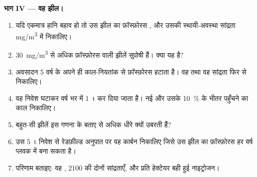 \begin{problem}
\medskip
\noindent\textbf{भाग IV --- वह झील।}
\begin{enumerate}[resume]
  \item यदि एकमात्र हानि बहाव हो तो उस झील का फ़ॉस्फ़ोरस ,
        और उसकी स्थायी-अवस्था सांद्रता
        \unit{mg/m^3} में निकालिए।
  \item \qty{30}{mg/m^3} से अधिक फ़ॉस्फ़ोरस वाली झीलें
        सुपोषी हैं। क्या यह है?
  \item अवसादन 5 वर्ष के अपने ही काल-नियतांक से फ़ॉस्फ़ोरस हटाता है।
        वह  तथा वह सांद्रता फिर से
        निकालिए।
  \item वह निवेश घटाकर वर्ष भर में \qty{1}{t} कर दिया जाता है। नई
         और उसके \qty{10}{\%} के भीतर पहुँचने का काल निकालिए।
  \item बहुत-सी झीलें इस गणना के बताए से अधिक धीरे क्यों
        उबरती हैं?
  \item उस \qty{5}{t} निवेश से रेडफ़ील्ड अनुपात पर वह कार्बन निकालिए
        जिसे उस झील का फ़ॉस्फ़ोरस हर वर्ष प्लवक में बना सकता है।
  \item परिणाम बताइए: वह , 2100 की दोनों
        सांद्रताएँ, और प्रति हेक्टेयर बही हुई
        नाइट्रोजन।
\end{enumerate}
\end{problem}
